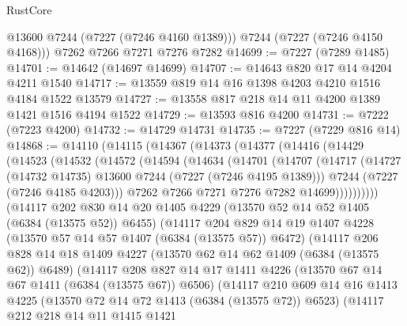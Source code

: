 \begin{lexlean}{RustCore}
\begin{coremodule}
        @13600
        @7244
        (@7227 (@7246 @4160 @1389)))
      @7244
      (@7227 (@7246 @4150 @4168)))
    @7262
    @7266
    @7271
    @7276
    @7282
@14699 := @7227 (@7289 @1485)
@14701 := @14642 (@14697 @14699)
@14707 := @14643 @820 @17 @14 @4204 @4211 @1540
@14717 := @13559 @819 @14 @16 @1398 @4203 @4210 @1516 @4184 @1522 @13579
@14727 := @13558 @817 @218 @14 @11 @4200 @1389 @1421 @1516 @4194 @1522
@14729 := @13593 @816 @4200
@14731 := @7222 (@7223 @4200)
@14732 := @14729 @14731
@14735 := @7227 (@7229 @816 @14)
@14868 := @14110
    (@14115
      (@14367
        (@14373
          (@14377
            (@14416
              (@14429
                (@14523
                  (@14532
                    (@14572
                      (@14594
                        (@14634
                          (@14701
                            (@14707
                              (@14717
                                (@14727 (@14732 @14735) @13600 @7244 (@7227 (@7246 @4195 @1389)))
                                @7244
                                (@7227 (@7246 @4185 @4203)))
                              @7262
                              @7266
                              @7271
                              @7276
                              @7282
                              @14699))))))))))
          (@14117
            @202
            @830
            @14
            @20
            @1405
            @4229
            (@13570 @52 @14 @52 @1405 (@6384 (@13575 @52)) @6455)
            (@14117
              @204
              @829
              @14
              @19
              @1407
              @4228
              (@13570 @57 @14 @57 @1407 (@6384 (@13575 @57)) @6472)
              (@14117
                @206
                @828
                @14
                @18
                @1409
                @4227
                (@13570 @62 @14 @62 @1409 (@6384 (@13575 @62)) @6489)
                (@14117
                  @208
                  @827
                  @14
                  @17
                  @1411
                  @4226
                  (@13570 @67 @14 @67 @1411 (@6384 (@13575 @67)) @6506)
                  (@14117
                    @210
                    @609
                    @14
                    @16
                    @1413
                    @4225
                    (@13570 @72 @14 @72 @1413 (@6384 (@13575 @72)) @6523)
                    (@14117
                      @212
                      @218
                      @14
                      @11
                      @1415
                      @1421

\end{coremodule}
\end{lexlean}
